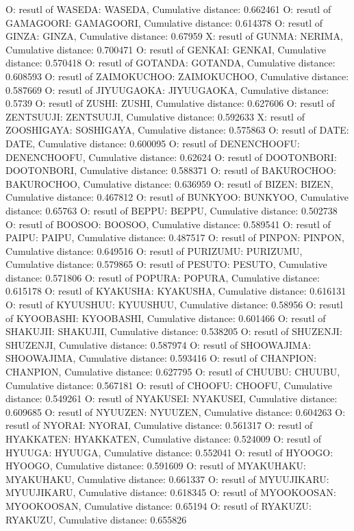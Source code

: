 O: resutl of WASEDA: WASEDA, Cumulative distance: 0.662461
O: resutl of GAMAGOORI: GAMAGOORI, Cumulative distance: 0.614378
O: resutl of GINZA: GINZA, Cumulative distance: 0.67959
X: resutl of GUNMA: NERIMA, Cumulative distance: 0.700471
O: resutl of GENKAI: GENKAI, Cumulative distance: 0.570418
O: resutl of GOTANDA: GOTANDA, Cumulative distance: 0.608593
O: resutl of ZAIMOKUCHOO: ZAIMOKUCHOO, Cumulative distance: 0.587669
O: resutl of JIYUUGAOKA: JIYUUGAOKA, Cumulative distance: 0.5739
O: resutl of ZUSHI: ZUSHI, Cumulative distance: 0.627606
O: resutl of ZENTSUUJI: ZENTSUUJI, Cumulative distance: 0.592633
X: resutl of ZOOSHIGAYA: SOSHIGAYA, Cumulative distance: 0.575863
O: resutl of DATE: DATE, Cumulative distance: 0.600095
O: resutl of DENENCHOOFU: DENENCHOOFU, Cumulative distance: 0.62624
O: resutl of DOOTONBORI: DOOTONBORI, Cumulative distance: 0.588371
O: resutl of BAKUROCHOO: BAKUROCHOO, Cumulative distance: 0.636959
O: resutl of BIZEN: BIZEN, Cumulative distance: 0.467812
O: resutl of BUNKYOO: BUNKYOO, Cumulative distance: 0.65763
O: resutl of BEPPU: BEPPU, Cumulative distance: 0.502738
O: resutl of BOOSOO: BOOSOO, Cumulative distance: 0.589541
O: resutl of PAIPU: PAIPU, Cumulative distance: 0.487517
O: resutl of PINPON: PINPON, Cumulative distance: 0.649516
O: resutl of PURIZUMU: PURIZUMU, Cumulative distance: 0.579865
O: resutl of PESUTO: PESUTO, Cumulative distance: 0.571806
O: resutl of POPURA: POPURA, Cumulative distance: 0.615178
O: resutl of KYAKUSHA: KYAKUSHA, Cumulative distance: 0.616131
O: resutl of KYUUSHUU: KYUUSHUU, Cumulative distance: 0.58956
O: resutl of KYOOBASHI: KYOOBASHI, Cumulative distance: 0.601466
O: resutl of SHAKUJII: SHAKUJII, Cumulative distance: 0.538205
O: resutl of SHUZENJI: SHUZENJI, Cumulative distance: 0.587974
O: resutl of SHOOWAJIMA: SHOOWAJIMA, Cumulative distance: 0.593416
O: resutl of CHANPION: CHANPION, Cumulative distance: 0.627795
O: resutl of CHUUBU: CHUUBU, Cumulative distance: 0.567181
O: resutl of CHOOFU: CHOOFU, Cumulative distance: 0.549261
O: resutl of NYAKUSEI: NYAKUSEI, Cumulative distance: 0.609685
O: resutl of NYUUZEN: NYUUZEN, Cumulative distance: 0.604263
O: resutl of NYORAI: NYORAI, Cumulative distance: 0.561317
O: resutl of HYAKKATEN: HYAKKATEN, Cumulative distance: 0.524009
O: resutl of HYUUGA: HYUUGA, Cumulative distance: 0.552041
O: resutl of HYOOGO: HYOOGO, Cumulative distance: 0.591609
O: resutl of MYAKUHAKU: MYAKUHAKU, Cumulative distance: 0.661337
O: resutl of MYUUJIKARU: MYUUJIKARU, Cumulative distance: 0.618345
O: resutl of MYOOKOOSAN: MYOOKOOSAN, Cumulative distance: 0.65194
O: resutl of RYAKUZU: RYAKUZU, Cumulative distance: 0.655826
